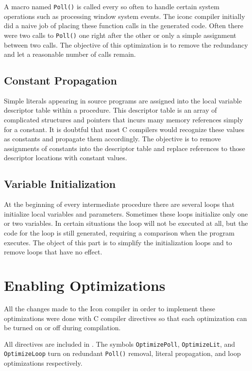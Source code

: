 A macro named \texttt{Poll()} is called every so often to handle
certain system operations such as processing window system events. The
iconc compiler initially did a naive job of placing these function
calls in the generated code. Often there were two calls to
\texttt{Poll()} one right after the other or only a simple assignment
between two calls. The objective of this optimization is to remove the
redundancy and let a reasonable number of calls remain.

\subsection{Constant Propagation}

Simple literals appearing in source programs are assigned into the
local variable descriptor table within a procedure. This descriptor
table is an array of complicated structures and pointers that incurs
many memory references simply for a constant. It is doubtful that most
C compilers would recognize these values as constants and
propagate them accordingly. The objective is to remove assignments of
constants into the descriptor table and replace references to those
descriptor locations with constant values.

\subsection{Variable Initialization}

At the beginning of every intermediate procedure there are several
loops that initialize local variables and parameters.  Sometimes these
loops initialize only one or two variables. In certain situations the
loop will not be executed at all, but the code for the loop is still
generated, requiring a comparison when the program executes. The
object of this part is to simplify the initialization loops and to
remove loops that have no effect.

\section{Enabling Optimizations}

All the changes made to the Icon compiler in order to implement these
optimizations were done with C compiler directives so that each
optimization can be turned on or off during compilation.

All directives are included in . The symbols
\texttt{OptimizePoll}, \texttt{OptimizeLit}, and \texttt{OptimizeLoop}
turn on redundant \texttt{Poll()} removal,
literal propagation, and loop optimizations respectively.

